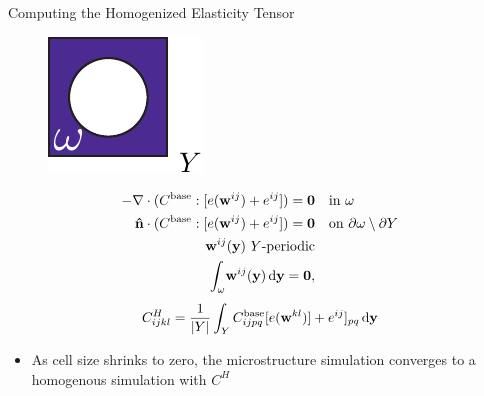 \begin{frame}{Computing the Homogenized Elasticity Tensor}
    \begin{figure}
        \includegraphics[width=.20\textwidth]{Images/cell.pdf}
    \end{figure}
    \begin{align*}
         -\nabla \cdot (C^\text{base} : [e({\bf w}^{ij}) + e^{ij}]) = {\bf 0} & \quad \text{in } \omega \\
    {\bf \hat n} \cdot (C^\text{base} : [e({\bf w}^{ij}) + e^{ij}]) = {\bf 0} & \quad \text{on } \partial \omega \setminus \partial Y \\
        {\bf w}^{ij}({\bf y})\ Y \text{-periodic} & \\
        \int_\omega \! {\bf w}^{ij}({\bf y})  \, \mathrm{d} {\bf y} =  {\bf 0}, 
    \end{align*}
    \begin{equation*}
        \label{eqn:Eh}
    C^H_{ijkl} = \frac{1}{|Y|} \int_Y C^\text{base}_{ijpq} [e({\bf w}^{kl})] + e^{ij}]_{pq} \, \mathrm{d} {\bf y}
    \end{equation*}
    \begin{itemize}
        \pause \item As cell size shrinks to zero, the microstructure simulation
            converges to a homogenous simulation with $C^H$
   \end{itemize}
\end{frame}

